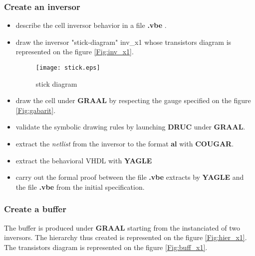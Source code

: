\documentclass[12pt]{article}
\begin{document}
\subsubsection{Create an inversor}

\begin{itemize}\itemsep=-.4ex
\item   describe the cell inversor behavior in a file { \bf .vbe } .
\item   draw the inversor "stick-diagram" inv\_x1 whose transistors diagram
        is represented on the figure \ref{Fig:inv_x1}.

\begin{figure}[H]\centering
  \texttt{[image: stick.eps]}
  \caption{stick diagram}
  \label{Fig:stick}
\end{figure}

\item   draw the cell under {\bf GRAAL} by respecting the
        gauge specified on the figure \ref{Fig:gabarit}.
\item   validate the symbolic drawing rules by launching {\bf DRUC} under {\bf GRAAL}.
\item   extract the { \it netlist } \/from the inversor to the format {\bf al} with {\bf COUGAR}.
\item   extract the behavioral VHDL with { \bf YAGLE }
\item   carry out the formal proof between the file { \bf .vbe } extracts by { \bf YAGLE }
        and the file { \bf .vbe } from the initial specification.
\end{itemize}

\subsubsection{Create a buffer}

The buffer is produced under { \bf GRAAL } starting from the
instanciated of two inversors. The hierarchy thus created is
represented on the figure \ref{Fig:hier_x1}. The transistors
diagram is represented on the figure \ref{Fig:buff_x1}.
\end{document}
